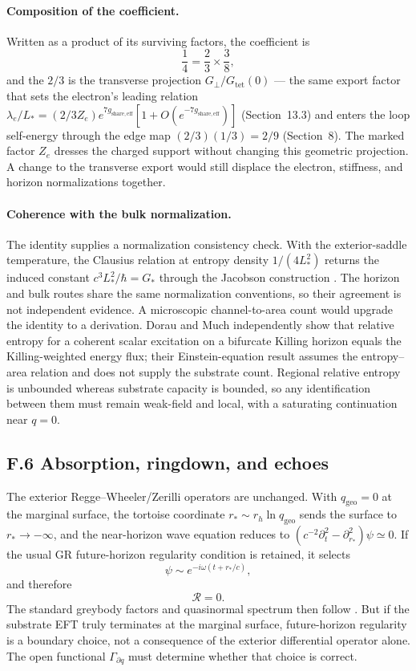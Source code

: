 \documentclass[11pt]{article}
\begin{document}
\paragraph{Composition of the coefficient.}
Written as a product of its surviving factors, the coefficient is
\[
\frac14=\frac23\times\frac38,
\]
and the $2/3$ is the transverse projection $G_\perp/G_{\mathrm{tet}}(0)$ --- the same export factor that sets the electron's leading relation $\lambda_e/L_*=(2/3Z_e)e^{7g_{\mathrm{share,eff}}}[1+O(e^{-7g_{\mathrm{share,eff}}})]$ (Section~13.3) and enters the loop self-energy through the edge map $(2/3)(1/3)=2/9$ (Section~8). The marked factor $Z_e$ dresses the charged support without changing this geometric projection. A change to the transverse export would still displace the electron, stiffness, and horizon normalizations together.

\paragraph{Coherence with the bulk normalization.}
The identity supplies a normalization consistency check. With the exterior-saddle temperature, the Clausius relation at entropy density $1/(4L_*^2)$ returns the induced constant $c^3L_*^2/\hbar=G_*$ through the Jacobson construction \citep{Jacobson1995}. The horizon and bulk routes share the same normalization conventions, so their agreement is not independent evidence. A microscopic channel-to-area count would upgrade the identity to a derivation. Dorau and Much \citep{DorauMuch2026} independently show that relative entropy for a coherent scalar excitation on a bifurcate Killing horizon equals the Killing-weighted energy flux; their Einstein-equation result assumes the entropy--area relation and does not supply the substrate count. Regional relative entropy is unbounded whereas substrate capacity is bounded, so any identification between them must remain weak-field and local, with a saturating continuation near $q=0$.

\subsection*{F.6 Absorption, ringdown, and echoes}

The exterior Regge--Wheeler/Zerilli operators are unchanged. With $q_{\mathrm{geo}}=0$ at the marginal surface, the tortoise coordinate $r_*\sim r_h\ln q_{\mathrm{geo}}$ sends the surface to $r_*\to-\infty$, and the near-horizon wave equation reduces to $(c^{-2}\partial_t^2-\partial_{r_*}^2)\psi\simeq0$. If the usual GR future-horizon regularity condition is retained, it selects
\[
\psi\sim e^{-i\omega(t+r_*/c)},
\]
and therefore
\[
\mathcal R=0.
\]
The standard greybody factors and quasinormal spectrum then follow \citep{ReggeWheeler1957,Zerilli1970}. But if the substrate EFT truly terminates at the marginal surface, future-horizon regularity is a boundary choice, not a consequence of the exterior differential operator alone. The open functional $\Gamma_{\partial q}$ must determine whether that choice is correct.
\end{document}

